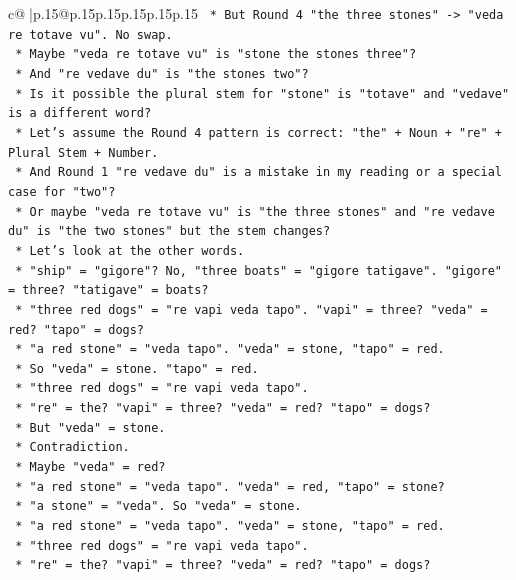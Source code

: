 \documentclass{article}
\begin{document}
{\begin{supertabular}{c@{$\;$}|p{.15\linewidth}@{}p{.15\linewidth}p{.15\linewidth}p{.15\linewidth}p{.15\linewidth}p{.15\linewidth}}
{{{\texttt{        *   But Round 4 "the three stones" {-}> "veda re totave vu". No swap.} \\
\texttt{        *   Maybe "veda re totave vu" is "stone the stones three"?} \\
\texttt{        *   And "re vedave du" is "the stones two"?} \\
\texttt{        *   Is it possible the plural stem for "stone" is "totave" and "vedave" is a different word?} \\
\texttt{        *   Let's assume the Round 4 pattern is correct: "the" + Noun + "re" + Plural Stem + Number.} \\
\texttt{        *   And Round 1 "re vedave du" is a mistake in my reading or a special case for "two"?} \\
\texttt{        *   Or maybe "veda re totave vu" is "the three stones" and "re vedave du" is "the two stones" but the stem changes?} \\
\texttt{        *   Let's look at the other words.} \\
\texttt{        *   "ship" = "gigore"? No, "three boats" = "gigore tatigave". "gigore" = three? "tatigave" = boats?} \\
\texttt{        *   "three red dogs" = "re vapi veda tapo". "vapi" = three? "veda" = red? "tapo" = dogs?} \\
\texttt{        *   "a red stone" = "veda tapo". "veda" = stone, "tapo" = red.} \\
\texttt{        *   So "veda" = stone. "tapo" = red.} \\
\texttt{        *   "three red dogs" = "re vapi veda tapo".} \\
\texttt{        *   "re" = the? "vapi" = three? "veda" = red? "tapo" = dogs?} \\
\texttt{        *   But "veda" = stone.} \\
\texttt{        *   Contradiction.} \\
\texttt{        *   Maybe "veda" = red?} \\
\texttt{        *   "a red stone" = "veda tapo". "veda" = red, "tapo" = stone?} \\
\texttt{        *   "a stone" = "veda". So "veda" = stone.} \\
\texttt{        *   "a red stone" = "veda tapo". "veda" = stone, "tapo" = red.} \\
\texttt{        *   "three red dogs" = "re vapi veda tapo".} \\
\texttt{        *   "re" = the? "vapi" = three? "veda" = red? "tapo" = dogs?} \\
}}}
\end{supertabular}}
\end{document}
